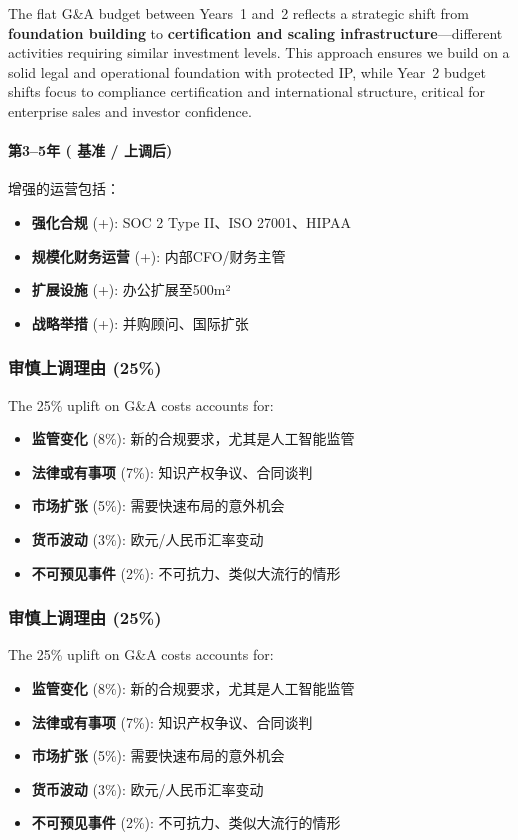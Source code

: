 \documentclass[11pt, a4paper, oneside]{article}
\begin{document}
The flat G\&A budget between Years~1 and~2 reflects a strategic shift from \textbf{foundation building} to \textbf{certification and scaling infrastructure}---different activities requiring similar investment levels. This approach ensures we build on a solid legal and operational foundation with protected IP, while Year~2 budget shifts focus to compliance certification and international structure, critical for enterprise sales and investor confidence.

\paragraph{第3--5年 ( 基准 /  上调后)}
增强的运营包括：
\begin{itemize}
    \item \textbf{强化合规} (+): SOC 2 Type II、ISO 27001、HIPAA
    \item \textbf{规模化财务运营} (+): 内部CFO/财务主管
    \item \textbf{扩展设施} (+): 办公扩展至500m²
    \item \textbf{战略举措} (+): 并购顾问、国际扩张
\end{itemize}

\subsubsection{审慎上调理由 (25\%)}
The 25\% uplift on G\&A costs accounts for:
\begin{itemize}
    \item \textbf{监管变化} (8\%): 新的合规要求，尤其是人工智能监管
    \item \textbf{法律或有事项} (7\%): 知识产权争议、合同谈判
    \item \textbf{市场扩张} (5\%): 需要快速布局的意外机会
    \item \textbf{货币波动} (3\%): 欧元/人民币汇率变动
    \item \textbf{不可预见事件} (2\%): 不可抗力、类似大流行的情形
\end{itemize}
\subsubsection{审慎上调理由 (25\%)}
The 25\% uplift on G\&A costs accounts for:
\begin{itemize}
    \item \textbf{监管变化} (8\%): 新的合规要求，尤其是人工智能监管
    \item \textbf{法律或有事项} (7\%): 知识产权争议、合同谈判
    \item \textbf{市场扩张} (5\%): 需要快速布局的意外机会
    \item \textbf{货币波动} (3\%): 欧元/人民币汇率变动
    \item \textbf{不可预见事件} (2\%): 不可抗力、类似大流行的情形
\end{itemize}
\end{document}
